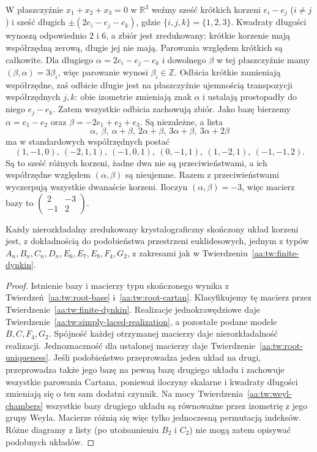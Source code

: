 \begin{przyklad}[Model $G_2$]
\label{aa:prz:g2-roots}
W płaszczyźnie $x_1+x_2+x_3=0$ w $\mathbb R^3$
weźmy sześć krótkich korzeni $e_i-e_j$ ($i\ne j$)
i sześć długich $\pm(2e_i-e_j-e_k)$, gdzie
$\{i,j,k\}=\{1,2,3\}$. Kwadraty długości wynoszą
odpowiednio $2$ i $6$, a zbiór jest zredukowany:
krótkie korzenie mają współrzędną zerową,
długie jej nie mają. Parowania względem krótkich
są całkowite. Dla długiego
$\alpha=2e_i-e_j-e_k$ i dowolnego $\beta$
w tej płaszczyźnie mamy $(\beta,\alpha)=3\beta_i$,
więc parowanie wynosi $\beta_i\in\mathbb Z$.
Odbicia krótkie zamieniają współrzędne,
zaś odbicie długie jest na płaszczyźnie
ujemnością transpozycji współrzędnych $j,k$:
obie izometrie zmieniają znak $\alpha$ i ustalają
prostopadły do niego $e_j-e_k$.
Zatem wszystkie odbicia zachowują zbiór.
Jako bazę bierzemy $\alpha=e_1-e_2$ oraz
$\beta=-2e_1+e_2+e_3$. Są niezależne, a lista
\[
 \alpha,\ \beta,\ \alpha+\beta,\ 2\alpha+\beta,\
 3\alpha+\beta,\ 3\alpha+2\beta
\]
ma w standardowych współrzędnych postać
\[
 (1,-1,0),\ (-2,1,1),\ (-1,0,1),\
 (0,-1,1),\ (1,-2,1),\ (-1,-1,2).
\]
Są to sześć różnych korzeni, żadne dwa nie są
przeciwieństwami, a ich współrzędne względem
$(\alpha,\beta)$ są nieujemne. Razem z przeciwieństwami
wyczerpują wszystkie dwanaście korzeni.
Iloczyn $(\alpha,\beta)=-3$, więc macierz bazy
to $\begin{pmatrix}2&-3\\-1&2\end{pmatrix}$.
\end{przyklad}

\begin{wniosek}
\label{aa:cor:root-classification}
Każdy nierozkładalny zredukowany krystalograficzny
skończony układ korzeni jest, z dokładnością do
podobieństwa przestrzeni euklidesowych, jednym
z typów $A_n,B_n,C_n,D_n,E_6,E_7,E_8,F_4,G_2$,
z zakresami jak w Twierdzeniu~\ref{aa:tw:finite-dynkin}.
\end{wniosek}
\begin{proof}
Istnienie bazy i macierzy typu skończonego wynika
z Twierdzeń~\ref{aa:tw:root-base}
i~\ref{aa:tw:root-cartan}. Klasyfikujemy tę macierz
przez Twierdzenie~\ref{aa:tw:finite-dynkin}.
Realizacje jednokrawędziowe daje
Twierdzenie~\ref{aa:tw:simply-laced-realization},
a pozostałe podane modele $B,C,F_4,G_2$.
Spójność każdej otrzymanej macierzy daje
nierozkładalność realizacji. Jednoznaczność dla
ustalonej macierzy daje Twierdzenie~\ref{aa:tw:root-uniqueness}.
Jeśli podobieństwo przeprowadza jeden układ na drugi,
przeprowadza także jego bazę na pewną bazę drugiego
układu i zachowuje wszystkie parowania Cartana,
ponieważ iloczyny skalarne i kwadraty długości
zmieniają się o ten sam dodatni czynnik.
Na mocy Twierdzenia~\ref{aa:tw:weyl-chambers}
wszystkie bazy drugiego układu są równoważne przez
izometrię z jego grupy Weyla. Macierze różnią się
więc tylko jednoczesną permutacją indeksów.
Różne diagramy z listy (po utożsamieniu $B_2$ i $C_2$)
nie mogą zatem opisywać podobnych układów.
\end{proof}

